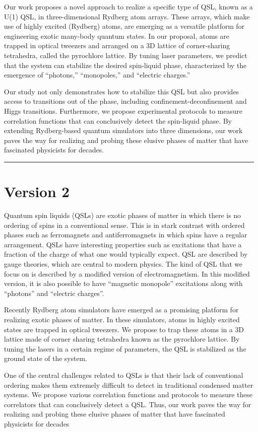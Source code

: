 \documentclass[
onecolumn,
superscriptaddress,
longbibliography,
nofootinbib,
 amsmath,amssymb,
 aps,
prb
]{revtex4-2}
\begin{document}
Our work proposes a novel approach to realize a specific type of QSL, known as a U(1) QSL, in three-dimensional Rydberg atom arrays. These arrays, which make use of highly excited (Rydberg) atoms, are emerging as a versatile platform for engineering exotic many-body quantum states. In our proposal, atoms are trapped in optical tweezers and arranged on a 3D lattice of corner-sharing tetrahedra, called the pyrochlore lattice. By tuning laser parameters, we predict that the system can stabilize the desired spin-liquid phase, characterized by the emergence of “photons,” “monopoles,” and “electric charges.”

Our study not only demonstrates how to stabilize this QSL but also provides access to transitions out of the phase, including confinement-deconfinement and Higgs transitions. Furthermore, we propose experimental protocols to measure correlation functions that can conclusively detect the spin-liquid phase. By extending Rydberg-based quantum simulators into three dimensions, our work paves the way for realizing and probing these elusive phases of matter that have fascinated physicists for decades.

\hrule
\vspace{0.5cm}

\section{Version 2}

Quantum spin liquids (QSLs) are exotic phases of matter in which there is no ordering of spins in a conventional sense. This is in stark contrast with ordered phases such as ferromagnets and antiferromagnets in which spins have a regular arrangement. QSLs have interesting properties such as excitations that have a fraction of the charge of what one would typically expect. QSL are described by gauge theories, which are central to modern physics. The kind of QSL that we focus on is described by a modified version of electromagnetism. In this modified version, it is also possible to have “magnetic monopole” excitations along with “photons” and “electric charges”. 

Recently Rydberg atom simulators have emerged as a promising platform for realizing exotic phases of matter. In these simulators, atoms in highly excited states are trapped in optical tweezers. We propose to trap these atoms in a 3D lattice made of corner sharing tetrahedra known as the pyrochlore lattice. By tuning the lasers in a certain regime of parameters, the QSL is stabilized as the ground state of the system.

One of the central challenges related to QSLs is that their lack of conventional ordering makes them extremely difficult to detect in traditional condensed matter systems. We propose various correlation functions and protocols to measure these correlators that can conclusively detect a QSL. Thus, our work paves the way for realizing and probing these elusive phases of matter that have fascinated physicists for decades





\end{document}
